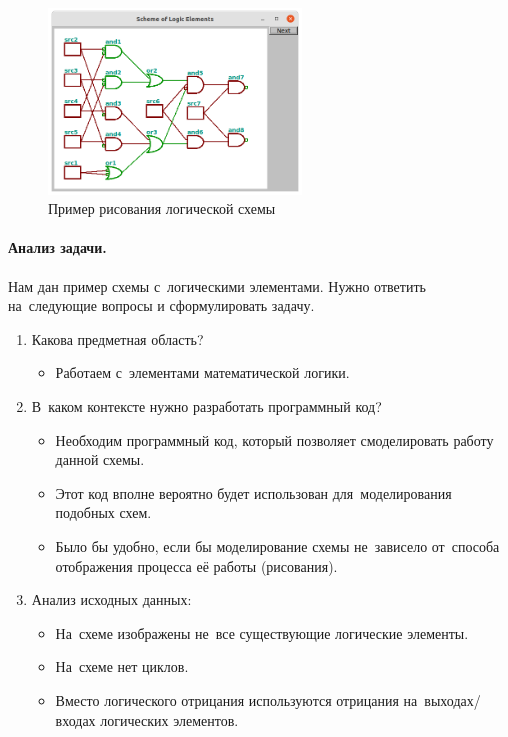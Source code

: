 \begin{figure}[h]
    {\centering
        \includegraphics[width=0.6\textwidth]{images/logic_elements.png}

    }
    \caption{Пример рисования логической схемы}
    \label{fig:logicelems}
\end{figure}



\paragraph{Анализ задачи.}
Нам дан пример схемы с~логическими элементами. Нужно ответить на~следующие вопросы и сформулировать задачу.
\begin{enumerate}
    \item Какова предметная область?
    \begin{itemize}
        \item Работаем с~элементами математической логики.
    \end{itemize}

    \item В~каком контексте нужно разработать программный код?
    \begin{itemize}
        \item Необходим программный код, который позволяет смоделировать работу данной схемы.
        \item Этот код вполне вероятно будет использован для~моделирования подобных схем.
        \item Было бы удобно, если бы моделирование схемы не~зависело от~способа отображения процесса её работы (рисования).
    \end{itemize}

    \item Анализ исходных данных:
    \begin{itemize}
        \item На~схеме изображены не~все существующие логические элементы.
        \item На~схеме нет циклов.
        \item Вместо логического отрицания используются отрицания на~выходах/входах логических элементов.
    \end{itemize}
\end{enumerate}



